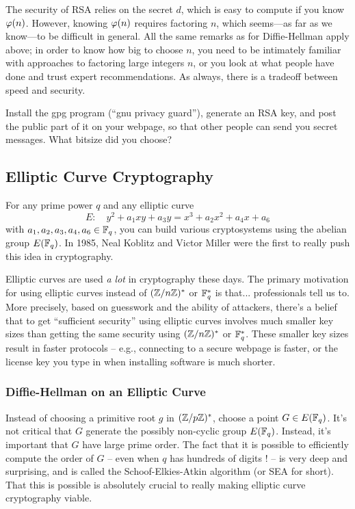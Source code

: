 \documentclass{book}
\begin{document}
The security of RSA relies on the secret $d$, which is easy
to compute if you know $\varphi(n)$.  However, knowing $\varphi(n)$
requires factoring $n$, which seems---as far as we know---to
be difficult in general.   All the same remarks as for Diffie-Hellman
apply above; in order to know how big to choose $n$, you need
to be intimately familiar with approaches to factoring large integers
$n$, or you look at what people have done and trust expert recommendations.
As always, there is a tradeoff between speed and security.

\begin{exercise}
Install the gpg program (``gnu privacy guard''), generate an RSA
key, and post the public part of it on your webpage, so that other
people can send you secret messages.  What bitsize did you choose?
\end{exercise}

\subsection{Elliptic Curve Cryptography}

For any prime power $q$ and any elliptic curve
$$
E: \quad y^2 + a_1 xy + a_3y = x^3 + a_2 x^2 + a_4 x + a_6
$$
with $a_1, a_2, a_3, a_4, a_6 \in \mathbb{F}_q$,
you can build various cryptosystems
using the abelian group $E(\mathbb{F}_q)$.
In 1985, Neal Koblitz and Victor Miller were the first to really
push this idea in cryptography.

Elliptic curves are used {\em a lot} in cryptography
these days.  The primary motivation for using elliptic curves
instead of $(\mathbb{Z}/n\mathbb{Z})^*$ or $\mathbb{F}_q^*$ is that... professionals
tell us to.  More precisely, based on guesswork and
the ability of attackers, there's a belief that to get
``sufficient security'' using elliptic curves involves
much smaller key sizes than getting the same security
using $(\mathbb{Z}/n\mathbb{Z})^*$ or $\mathbb{F}_q^*$.  These smaller key sizes
result in faster protocols -- e.g., connecting to a secure
webpage is faster, or the license key you
type in when installing software is much shorter.

\subsubsection{Diffie-Hellman on an Elliptic Curve}
Instead of choosing a primitive root $g$ in $(\mathbb{Z}/p\mathbb{Z})^*$,
choose a point $G \in E(\mathbb{F}_q)$.  It's not critical that
$G$ generate the possibly non-cyclic group $E(\mathbb{F}_q)$.
Instead, it's important that $G$ have large prime order.
The fact that it is possible to efficiently compute the
order of $G$ -- even when $q$ has hundreds of digits ! --
is very deep and surprising, and is called the
Schoof-Elkies-Atkin algorithm (or SEA for short).
That this is possible is absolutely crucial to really
making elliptic curve cryptography viable.
\end{document}

